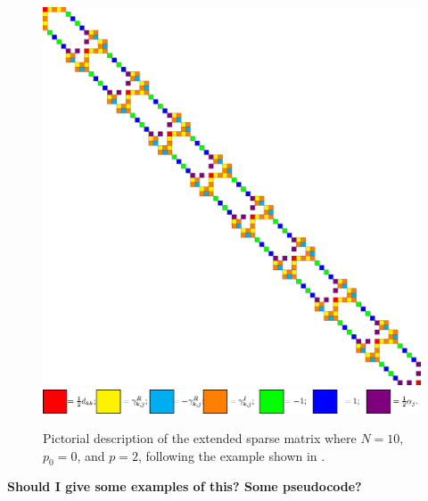\documentclass[manuscript, letterpaper]{aastex6}
\begin{document}
\begin{figure}[!htbp]
\begin{center}
\includegraphics[scale=0.175]{./twoterm.eps}
\hspace{0.2in}
\includegraphics[scale=1.0]{./colorcode.eps}
\end{center}
\caption{Pictorial description of the extended sparse matrix where $N=10$, $p_0=0$, and $p=2$, following
the example shown in \citet{Ambikasaran2015}.}
\label{matrix_structure}
\end{figure}

{\bf Should I give some examples of this?  Some pseudocode?}


\end{document}

